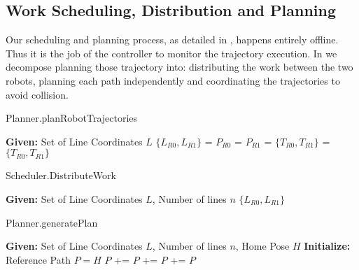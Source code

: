 
\subsection{Work Scheduling, Distribution and Planning}
\label{sec:software_sdp}

Our scheduling and planning process, as detailed in , happens entirely offline. Thus it is the job of the controller to monitor the trajectory execution. In  we decompose planning those trajectory into: distributing the work between the two robots, planning each path independently and coordinating the trajectories to avoid collision. 

\begin{algorithm}[ht!]
\caption{Planner.planRobotTrajectories}
\label{algo:sdp_overview}
\begin{algorithmic}[1]  
\State \textbf{Given:} Set of Line Coordinates $L$ 
\State $\{L_{R0}, L_{R1}\}$ = 
\State $P_{R0}$ = 
\State $P_{R1}$ = 
\State $\{T_{R0}, T_{R1}\}$ = 
\State \Return $\{T_{R0}, T_{R1}\}$
\end{algorithmic}
\end{algorithm}

\begin{algorithm}[ht!]
\caption{Scheduler.DistributeWork}
\label{algo:distribute}
\begin{algorithmic}[1]  
\State \textbf{Given:} Set of Line Coordinates $L$, Number of lines $n$
\State {}
\State \Return $\{L_{R0}, L_{R1}\}$
\end{algorithmic}
\end{algorithm}

\begin{algorithm}[ht!]
\caption{Planner.generatePlan}
\label{algo:generatePlan}
\begin{algorithmic}[1]  
\State \textbf{Given:} Set of Line Coordinates $L$, Number of lines $n$, Home Pose $H$
\State \textbf{Initialize:} Reference Path $P = H$
\State $P$ += 
\State $P$ += 
\EndProcedure
\State $P$ += 
\State \Return $P$
\end{algorithmic}
\end{algorithm}

